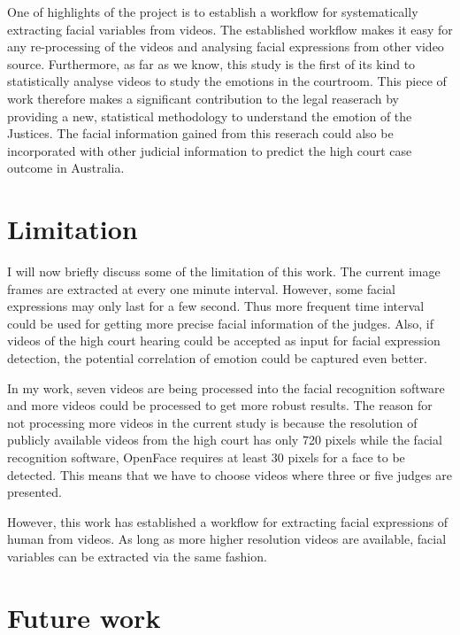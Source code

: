 \documentclass{monashthesis}
\begin{document}
One of highlights of the project is to establish a workflow for systematically extracting facial variables from videos. The established workflow makes it easy for any re-processing of the videos and analysing facial expressions from other video source. Furthermore, as far as we know, this study is the first of its kind to statistically analyse videos to study the emotions in the courtroom. This piece of work therefore makes a significant contribution to the legal reaserach by providing a new, statistical methodology to understand the emotion of the Justices. The facial information gained from this reserach could also be incorporated with other judicial information to predict the high court case outcome in Australia.

\hypertarget{limitation}{%
\section{Limitation}\label{limitation}}

I will now briefly discuss some of the limitation of this work. The current image frames are extracted at every one minute interval. However, some facial expressions may only last for a few second. Thus more frequent time interval could be used for getting more precise facial information of the judges. Also, if videos of the high court hearing could be accepted as input for facial expression detection, the potential correlation of emotion could be captured even better.

In my work, seven videos are being processed into the facial recognition software and more videos could be processed to get more robust results. The reason for not processing more videos in the current study is because the resolution of publicly available videos from the high court has only 720 pixels while the facial recognition software, OpenFace requires at least 30 pixels for a face to be detected. This means that we have to choose videos where three or five judges are presented.

However, this work has established a workflow for extracting facial expressions of human from videos. As long as more higher resolution videos are available, facial variables can be extracted via the same fashion.

\hypertarget{future-work}{%
\section{Future work}\label{future-work}}
\end{document}
